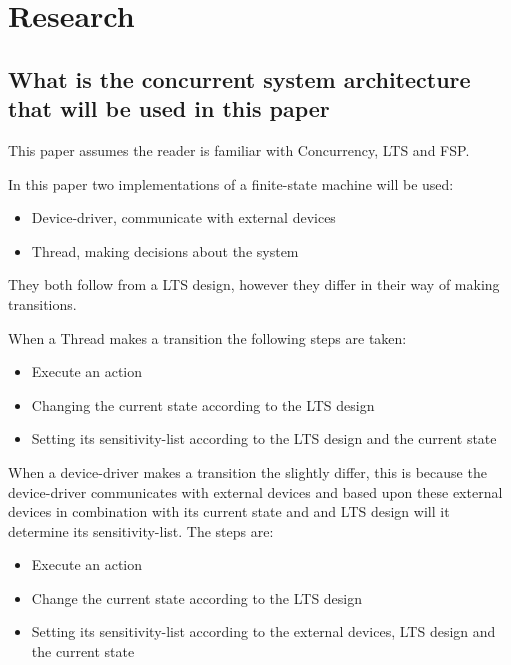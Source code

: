 \hypertarget{research}{%
\chapter{Research}\label{research}}

\hypertarget{what-is-the-concurrent-system-architecture-that-will-be-used-in-this-paper}{%
\section{What is the concurrent system architecture that will be used in
this
paper}\label{what-is-the-concurrent-system-architecture-that-will-be-used-in-this-paper}}

This paper assumes the reader is familiar with Concurrency, LTS and FSP.

In this paper two implementations of a finite-state machine will be
used:

\begin{itemize}
\tightlist
\item
  Device-driver, communicate with external devices
\item
  Thread, making decisions about the system
\end{itemize}

They both follow from a LTS design, however they differ in their way of
making transitions.

When a Thread makes a transition the following steps are taken:

\begin{itemize}
\tightlist
\item
  Execute an action
\item
  Changing the current state according to the LTS design
\item
  Setting its sensitivity-list according to the LTS design and the
  current state
\end{itemize}

When a device-driver makes a transition the slightly differ, this is
because the device-driver communicates with external devices and based
upon these external devices in combination with its current state and
and LTS design will it determine its sensitivity-list. The steps are:

\begin{itemize}
\tightlist
\item
  Execute an action
\item
  Change the current state according to the LTS design
\item
  Setting its sensitivity-list according to the external devices, LTS
  design and the current state
\end{itemize}

